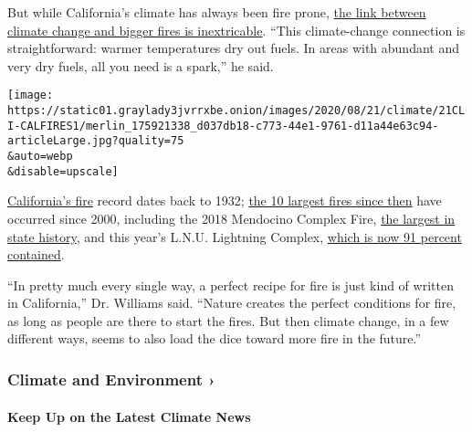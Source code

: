 But while California's climate has always been fire prone,
\href{https://agupubs.onlinelibrary.wiley.com/doi/full/10.1029/2019EF001210}{the
link between climate change and bigger fires is inextricable}. ``This
climate-change connection is straightforward: warmer temperatures dry
out fuels. In areas with abundant and very dry fuels, all you need is a
spark,'' he said.

\texttt{[image: https://static01.graylady3jvrrxbe.onion/images/2020/08/21/climate/21CLI-CALFIRES1/merlin\_175921338\_d037db18-c773-44e1-9761-d11a44e63c94-articleLarge.jpg?quality=75\\\&auto=webp\\\&disable=upscale]}

\href{https://www.nytimes3xbfgragh.onion/interactive/2019/03/18/business/pge-california-wildfires.html}{California's
fire} record dates back to 1932;
\href{https://www.fire.ca.gov/media/5510/top20_acres.pdf}{the 10 largest
fires since then} have occurred since 2000, including the 2018 Mendocino
Complex Fire,
\href{https://www.nytimes3xbfgragh.onion/2018/08/07/us/mendocino-complex-fire-california.html}{the
largest in state history}, and this year's L.N.U. Lightning Complex,
\href{https://www.fire.ca.gov/incidents/2020/8/17/lnu-lightning-complex-includes-hennessey-gamble-15-10-spanish-markley-13-4-11-16-walbridge/}{which
is now 91 percent contained}.

``In pretty much every single way, a perfect recipe for fire is just
kind of written in California,'' Dr. Williams said. ``Nature creates the
perfect conditions for fire, as long as people are there to start the
fires. But then climate change, in a few different ways, seems to also
load the dice toward more fire in the future.''

\href{\%3Ca\%20href=\%22https://www.nytimes3xbfgragh.onion/section/climate?action=click\&pgtype=Article\&state=default\&region=MAIN_CONTENT_1\&context=storylines_keepup\%22\%3Ehttps://www.nytimes3xbfgragh.onion/section/climate?action=click\&pgtype=Article\&state=default\&region=MAIN_CONTENT_1\&context=storylines_keepup\%3C/a\%3E}{}

\hypertarget{climate-and-environment-}{%
\subsubsection{Climate and Environment
›}\label{climate-and-environment-}}

\hypertarget{keep-up-on-the-latest-climate-news}{%
\paragraph{Keep Up on the Latest Climate
News}\label{keep-up-on-the-latest-climate-news}}

